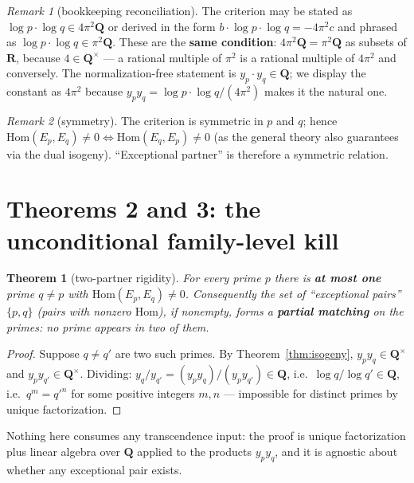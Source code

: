 \documentclass[11pt]{article}
\newtheorem{theorem}{Theorem}
\theoremstyle{definition}
\theoremstyle{remark}
\newtheorem{remark}{Remark}
\newcommand{\Q}{\mathbf{Q}}
\newcommand{\R}{\mathbf{R}}
\newcommand{\Hom}{\mathrm{Hom}}
\begin{document}
\begin{remark}[bookkeeping reconciliation]
\label{rem:bookkeeping}
The criterion may be stated as $\log p\cdot\log q \in 4\pi^2\Q$ or derived in
the form $b\cdot\log p\cdot\log q = -4\pi^2 c$ and phrased as
$\log p\cdot\log q \in \pi^2\Q$. These are the \textbf{same condition}:
$4\pi^2\Q = \pi^2\Q$ as subsets of $\R$, because $4 \in \Q^\times$ --- a
rational multiple of $\pi^2$ is a rational multiple of $4\pi^2$ and
conversely. The normalization-free statement is $y_p\cdot y_q \in \Q$; we
display the constant as $4\pi^2$ because
$y_p y_q = \log p\cdot\log q/(4\pi^2)$ makes it the natural one.
\end{remark}

\begin{remark}[symmetry]
\label{rem:symmetry}
The criterion is symmetric in $p$ and $q$; hence
$\Hom(E_p, E_q) \neq 0 \iff \Hom(E_q, E_p) \neq 0$ (as the general theory
also guarantees via the dual isogeny). ``Exceptional partner'' is therefore
a symmetric relation.
\end{remark}

\section{Theorems 2 and 3: the unconditional family-level kill}
\label{sec:familykill}

\begin{theorem}[two-partner rigidity]
\label{thm:twopartner}
For every prime $p$ there is \textbf{at most one} prime $q \neq p$ with
$\Hom(E_p, E_q) \neq 0$. Consequently the set of ``exceptional pairs''
$\{p, q\}$ (pairs with nonzero $\Hom$), if nonempty, forms a \textbf{partial
matching} on the primes: no prime appears in two of them.
\end{theorem}

\begin{proof}
Suppose $q \neq q'$ are two such primes. By Theorem~\ref{thm:isogeny},
$y_p y_q \in \Q^\times$ and $y_p y_{q'} \in \Q^\times$. Dividing:
$y_q / y_{q'} = (y_p y_q)/(y_p y_{q'}) \in \Q$, i.e.\
$\log q / \log q' \in \Q$, i.e.\ $q^m = q'^n$ for some positive integers
$m, n$ --- impossible for distinct primes by unique factorization.
\end{proof}

Nothing here consumes any transcendence input: the proof is unique
factorization plus linear algebra over $\Q$ applied to the products
$y_p y_q$, and it is agnostic about whether any exceptional pair exists.
\end{document}
